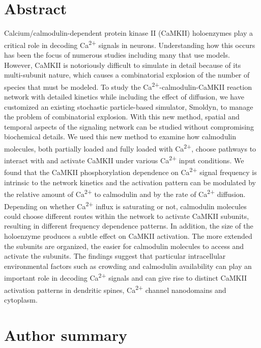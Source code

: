 \documentclass[10pt,letterpaper]{article}
\begin{document}
\section*{Abstract}
Calcium/calmodulin-dependent protein kinase II (CaMKII) holoenzymes play a critical role in decoding Ca\textsuperscript{2+} signals in neurons. Understanding how this occurs has been the focus of numerous studies including many that use models. However, CaMKII is notoriously difficult to simulate in detail because of its multi-subunit nature, which causes a combinatorial explosion of the number of species that must be modeled. To study the Ca\textsuperscript{2+}-calmodulin-CaMKII reaction network with detailed kinetics while including the effect of diffusion, we have customized an existing stochastic particle-based simulator, Smoldyn, to manage the problem of combinatorial explosion. With this new method, spatial and temporal aspects of the signaling network can be studied without compromising biochemical details. We used this new method to examine how calmodulin molecules, both partially loaded and fully loaded with Ca\textsuperscript{2+}, choose pathways to interact with and activate CaMKII under various Ca\textsuperscript{2+} input conditions. We found that the CaMKII phosphorylation dependence on Ca\textsuperscript{2+} signal frequency is intrinsic to the network kinetics and the activation pattern can be modulated by the relative amount of Ca\textsuperscript{2+} to calmodulin and by the rate of Ca\textsuperscript{2+} diffusion. Depending on whether Ca\textsuperscript{2+} influx is saturating or not, calmodulin molecules could choose different routes within the network to activate CaMKII subunits, resulting in different frequency dependence patterns. In addition, the size of the holoenzyme produces a subtle effect on CaMKII activation. The more extended the subunits are organized, the easier for calmodulin molecules to access and activate the subunits. The findings suggest that particular intracellular environmental factors such as crowding and calmodulin availability can play an important role in decoding Ca\textsuperscript{2+} signals and can give rise to distinct CaMKII activation patterns in dendritic spines, Ca\textsuperscript{2+} channel nanodomains and cytoplasm.
\section*{Author summary}
\end{document}
